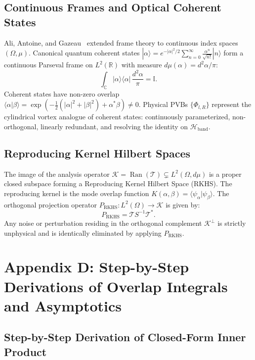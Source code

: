 \documentclass[11pt,a4paper]{article}
\begin{document}
\subsection{Continuous Frames and Optical Coherent States}

Ali, Antoine, and Gazeau~\cite{Ali1993,Gazeau2009} extended frame theory to continuous index spaces $(\Omega, \mu)$. Canonical quantum coherent states $|\alpha\rangle = e^{-|\alpha|^2/2} \sum_{n=0}^\infty \frac{\alpha^n}{\sqrt{n!}} |n\rangle$ form a continuous Parseval frame on $L^2(\mathbb{R})$ with measure $d\mu(\alpha) = d^2\alpha / \pi$:
\begin{equation}
\int_{\mathbb{C}} |\alpha\rangle \langle \alpha| \, \frac{d^2\alpha}{\pi} = \mathbb{I}.
\end{equation}
Coherent states have non-zero overlap $\langle \alpha | \beta \rangle = \exp(-\frac{1}{2}(|\alpha|^2 + |\beta|^2) + \alpha^* \beta) \neq 0$. Physical PVBs $\{\Phi_{l, R}\}$ represent the cylindrical vortex analogue of coherent states: continuously parameterized, non-orthogonal, linearly redundant, and resolving the identity on $\mathcal{H}_{\text{band}}$.

\subsection{Reproducing Kernel Hilbert Spaces}

The image of the analysis operator $\mathcal{K} = \operatorname{Ran}(\mathcal{T}) \subsetneq L^2(\Omega, d\mu)$ is a proper closed subspace forming a Reproducing Kernel Hilbert Space (RKHS). The reproducing kernel is the mode overlap function $K(\alpha, \beta) = \langle \psi_\alpha | \psi_\beta \rangle$. The orthogonal projection operator $P_{\text{RKHS}}: L^2(\Omega) \to \mathcal{K}$ is given by:
\begin{equation}
P_{\text{RKHS}} = \mathcal{T} S^{-1} \mathcal{T}^*.
\end{equation}
Any noise or perturbation residing in the orthogonal complement $\mathcal{K}^\perp$ is strictly unphysical and is identically eliminated by applying $P_{\text{RKHS}}$.

\section{Appendix D: Step-by-Step Derivations of Overlap Integrals and Asymptotics}
\label{app:derivations}

\subsection{Step-by-Step Derivation of Closed-Form Inner Product}
\end{document}
